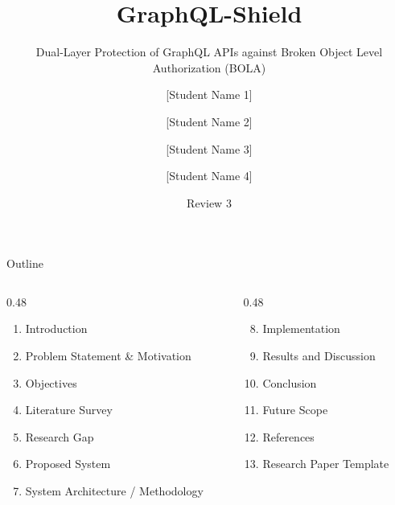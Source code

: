 \documentclass[aspectratio=169,11pt]{beamer}
\title[GraphQL-Shield]{GraphQL-Shield}
\subtitle{Dual-Layer Protection of GraphQL APIs against Broken Object Level Authorization (BOLA)}
\author[Team Name]{[Student Name 1] \and [Student Name 2] \and [Student Name 3] \and [Student Name 4]}
\institute[]{Guide: [Guide Name], [Designation]\\[2pt] Department of [Department], [College / University Name]}
\date{Review 3}
\begin{document}
\begin{frame}
  \titlepage
\end{frame}

\begin{frame}{Outline}
  \begin{columns}[T]
    \begin{column}{0.48\textwidth}
      \begin{enumerate}
        \item Introduction
        \item Problem Statement \& Motivation
        \item Objectives
        \item Literature Survey
        \item Research Gap
        \item Proposed System
        \item System Architecture / Methodology
      \end{enumerate}
    \end{column}
    \begin{column}{0.48\textwidth}
      \begin{enumerate}\setcounter{enumi}{7}
        \item Implementation
        \item Results and Discussion
        \item Conclusion
        \item Future Scope
        \item References
        \item Research Paper Template
      \end{enumerate}
    \end{column}
  \end{columns}
\end{frame}

\end{document}
